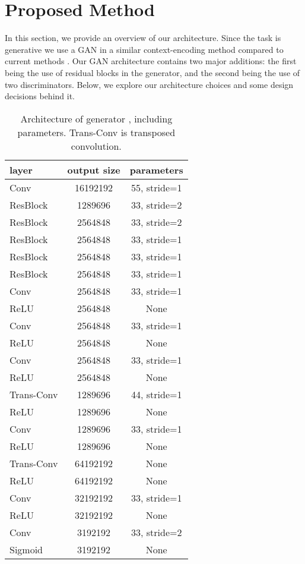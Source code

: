 \documentclass{article}
\begin{document}
\section{Proposed Method}
In this section, we provide an overview of our architecture. Since the task is generative we use a GAN in a similar context-encoding method compared to current methods \citep{van_hoorick_image_2020}\citep{pathak_context_2016}. Our GAN architecture contains two major additions: the first being the use of residual blocks in the generator, and the second being the use of two discriminators. Below, we explore our architecture choices and some design decisions behind it.

\begin{table}[h] 
  \centering  
    \begin{tabular}{lcc}  
    \hline
    \textbf{layer} & \textbf{output size} & \textbf{parameters}\\ 
    \hline \hline
      Conv & 16192192 & 55, stride=1 \\
    \hline
      ResBlock & 1289696 & 33, stride=2 \\
    \hline
      ResBlock & 2564848 & 33, stride=2 \\
    \hline
      ResBlock & 2564848 & 33, stride=1 \\
    \hline
      ResBlock & 2564848 & 33, stride=1 \\
    \hline
      ResBlock & 2564848 & 33, stride=1 \\
    \hline
      Conv & 2564848 & 33, stride=1 \\
    \hline
      ReLU & 2564848 & None \\
    \hline
      Conv & 2564848 & 33, stride=1 \\
    \hline
      ReLU & 2564848 & None \\
    \hline
      Conv & 2564848 & 33, stride=1 \\
    \hline
      ReLU & 2564848 & None \\
    \hline
      Trans-Conv & 1289696 & 44, stride=1 \\
    \hline
      ReLU & 1289696 & None \\
    \hline
      Conv & 1289696 & 33, stride=1 \\
    \hline
      ReLU & 1289696 & None \\
    \hline
      Trans-Conv & 64192192 & None \\
    \hline
      ReLU & 64192192 & None \\
    \hline
      Conv & 32192192 & 33, stride=1 \\
    \hline
      ReLU & 32192192 & None \\
    \hline
      Conv & 3192192 & 33, stride=2 \\
    \hline
      Sigmoid & 3192192 & None \\
    \hline
    \end{tabular}
  
  \caption{Architecture of generator , including parameters. Trans-Conv is transposed convolution.} 
  \label{tab:1} 
\end{table}
\end{document}
